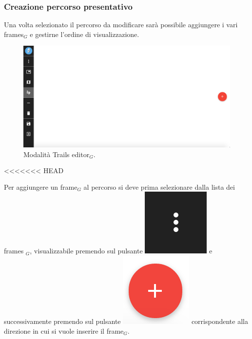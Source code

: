 \subsubsection{Creazione percorso presentativo}
Una volta selezionato il percorso da modificare sarà possibile aggiungere i vari frames$_G$ e gestirne l'ordine di visualizzazione.

\begin{figure}[!h]
\begin{center}
\includegraphics[scale=0.35]{img/edit_trail.png}
\caption{Modalità Trails editor$_G$.}
\end{center}
\end{figure}
<<<<<<< HEAD

Per aggiungere un frame$_G$ al percorso si deve prima selezionare dalla lista dei frames $_G$, visualizzabile premendo sul pulsante \includegraphics[scale=0.4]{img/frames_to_be_added.png} e successivamente premendo sul pulsante \includegraphics[scale=0.4]{img/add.png} corrispondente alla direzione in cui si vuole inserire il frame$_G$.\\

